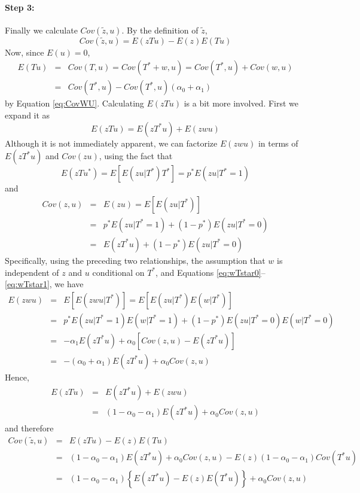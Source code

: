 \paragraph{Step 3:} Finally we calculate $Cov(\widetilde{z},u)$.
By the definition of $\widetilde{z}$,
\begin{equation*}
  Cov(\widetilde{z},u) =  E(zTu) - E(z)E(Tu)
\end{equation*}
Now, since $E(u) = 0$, 
\begin{eqnarray*}
 E(Tu) &=& Cov(T,u) = Cov(T^* + w, u) = Cov(T^*,u) + Cov(w,u)\\
 &=& Cov(T^*,u) - Cov(T^*,u)(\alpha_0 + \alpha_1)
\end{eqnarray*}
by Equation \ref{eq:CovWU}. 
Calculating $E(zTu)$ is a bit more involved.
First we expand it as
\begin{equation*}
  E(zTu) = E(zT^*u) + E(zwu)
\end{equation*}
Although it is not immediately apparent, we can factorize $E(zwu)$ in terms of $E(zT^*u)$ and $Cov(zu)$, using the fact that
\begin{equation*}
  E(zTu^*) = E\left[ E\left( zu|T^* \right)T^* \right] = p^* E\left( zu|T^*=1 \right)
\end{equation*}
and
\begin{eqnarray*}
  Cov(z,u) &=& E(zu) = E\left[ E\left( zu|T^* \right) \right]\\
  &=& p^* E\left( zu|T^*=1 \right) + (1-p^*)E\left( zu|T^*=0 \right) \\
  &=& E(zT^*u) + (1-p^*)E\left( zu|T^*=0 \right)
\end{eqnarray*}
Specifically, using the preceding two relationships, the assumption that $w$ is independent of $z$ and $u$ conditional on $T^*$, and Equations \ref{eq:wTstar0}--\ref{eq:wTstar1}, we have
\begin{eqnarray*}
  E(zwu) &=& E\left[ E\left( zwu|T^* \right) \right] = E\left[ E\left( zu|T^* \right)E\left( w|T^* \right) \right]\\
  &=& p^*E\left( zu|T^*=1 \right)E\left( w|T^*=1 \right) + (1-p^*)E\left( zu|T^*=0 \right)E(w|T^*=0)\\
  &=& -\alpha_1 E(zT^*u) + \alpha_0\left[Cov(z,u) - E(zT^*u)\right]\\
  &=& -\left( \alpha_0 + \alpha_1 \right)E(zT^*u) + \alpha_0 Cov(z,u)
\end{eqnarray*}
Hence,
\begin{eqnarray*}
  E(zTu) &=&  E(zT^*u) + E(zwu)\\
  &=& (1 - \alpha_0 - \alpha_1) E(zT^*u) + \alpha_0 Cov(z,u)
\end{eqnarray*}
and therefore
\begin{eqnarray*}
  Cov(\widetilde{z},u) &=& E(zTu) - E(z)E(Tu) \\
  &=& (1 - \alpha_0 - \alpha_1) E(zT^*u) + \alpha_0 Cov(z,u) - E(z) \left( 1 - \alpha_0 -\alpha_1 \right)Cov(T^*u)\\
  &=& \left( 1-\alpha_0 - \alpha_1 \right)\left\{ E\left( zT^*u \right) - E(z)E(T^*u) \right\} + \alpha_0 Cov(z,u)
\end{eqnarray*}
